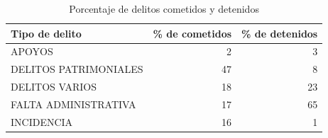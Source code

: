 \begin{table}[ht]
\centering
\caption{Porcentaje de delitos cometidos y detenidos} 
\begin{tabular}{lrr}
  \hline
Tipo de delito & \% de cometidos & \% de detenidos \\ 
  \hline
APOYOS & 2 & 3 \\ 
  DELITOS PATRIMONIALES & 47 & 8 \\ 
  DELITOS VARIOS & 18 & 23 \\ 
  FALTA ADMINISTRATIVA & 17 & 65 \\ 
  INCIDENCIA & 16 & 1 \\ 
   \hline
\end{tabular}

\end{table}
